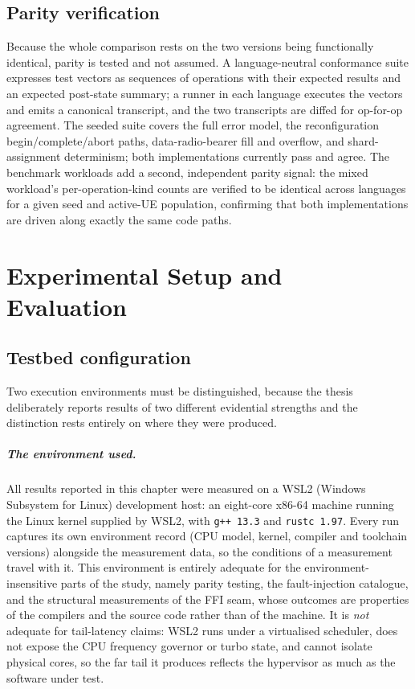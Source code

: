\documentclass[english,twoside,openright,a4paper,censored,csm,software-track-2020]{HYthesisML}
\begin{document}
\section{Parity verification}
\label{sec:parity}
Because the whole comparison rests on the two versions being functionally identical, parity
is tested and not assumed. A language-neutral conformance suite expresses test vectors as
sequences of operations with their expected results and an expected post-state summary; a
runner in each language executes the vectors and emits a canonical transcript, and the two
transcripts are diffed for op-for-op agreement. The seeded suite covers the full error model,
the reconfiguration begin/complete/abort paths, data-radio-bearer fill and overflow, and
shard-assignment determinism; both implementations currently pass and agree. The benchmark
workloads add a second, independent parity signal: the mixed workload's per-operation-kind
counts are verified to be identical across languages for a given seed and active-UE
population, confirming that both implementations are driven along exactly the same code paths.

\chapter{Experimental Setup and Evaluation\label{chapter:eval}}

\section{Testbed configuration\label{sec:testbed}}
Two execution environments must be distinguished, because the thesis deliberately reports
results of two different evidential strengths and the distinction rests entirely on where
they were produced.

\paragraph{The environment used.}
All results reported in this chapter were measured on a WSL2 (Windows Subsystem for Linux)
development host: an eight-core x86-64 machine running the Linux kernel supplied by WSL2,
with \texttt{g++~13.3} and \texttt{rustc~1.97}. Every run captures its own environment record
(CPU model, kernel, compiler and toolchain versions) alongside the measurement data, so the
conditions of a measurement travel with it. This environment is entirely adequate for the
environment-insensitive parts of the study, namely parity testing, the fault-injection
catalogue, and the structural measurements of the FFI seam, whose outcomes are properties of
the compilers and the source code rather than of the machine. It is \emph{not} adequate for
tail-latency claims: WSL2 runs under a virtualised scheduler, does not expose the CPU
frequency governor or turbo state, and cannot isolate physical cores, so the far tail it
produces reflects the hypervisor as much as the software under test.
\end{document}

